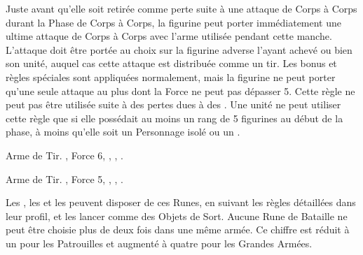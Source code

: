 Juste avant qu'elle soit retirée comme perte suite à une attaque de Corps à Corps durant la Phase de Corps à Corps, la figurine peut porter immédiatement une ultime attaque de Corps à Corps avec l'arme utilisée pendant cette manche. L'attaque doit être portée au choix sur la figurine adverse l'ayant achevé ou bien son unité, auquel cas cette attaque est distribuée comme un tir. Les bonus et règles spéciales sont appliquées normalement, mais la figurine ne peut porter qu'une seule attaque au plus dont la Force ne peut pas dépasser 5. Cette règle ne peut pas être utilisée suite à des pertes dues à des \impacthits{}. Une unité ne peut utiliser cette règle que si elle possédait au moins un rang de 5 figurines au début de la phase, à moins qu'elle soit un Personnage isolé ou un \vengeanceseeker{}.

\closearmyspecialrules






\vspace*{1.5cm}
\startarmyarmoury

\startitemlistonecol

\listitemonecol{\wyrmslayerrocket} Arme de Tir. , Force 6, \flamingattacks{}, , \reload{}.

\listitemonecol{\forgerepeater} Arme de Tir. , Force 5, \flamingattacks{}, , \quicktofire{}.

\enditemlistonecol

\closearmyarmoury





\subtitle{}

Les \runicmasters{}, les \runicsmiths{} et les \anvilsofpower{} peuvent disposer de ces Runes, en suivant les règles détaillées dans leur profil, et les lancer comme des Objets de Sort. Aucune Rune de Bataille ne peut être choisie plus de deux fois dans une même armée. Ce chiffre est réduit à un pour les Patrouilles et augmenté à quatre pour les Grandes Armées.

